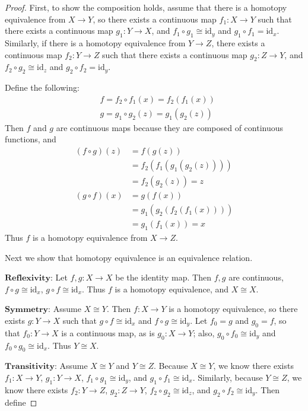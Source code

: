 \documentclass[12pt]{article}
\begin{document}
\begin{proof}
    First, to show the composition holds, assume that there is a homotopy equivalence from $X \to Y$, so there exists a continuous map $f_1: X \to Y$ such that there exists a continuous map $g_1: Y \to X$, and $f_1 \circ g_1 \cong \text{id}_y$ and $g_1 \circ f_1 = \text{id}_x$. Similarly, if there is a homotopy equivalence from $Y \to Z$, there exists a continuous map $f_2: Y \to Z$ such that there exists a continuous map $g_2: Z \to Y$, and $f_2 \circ g_2 \cong \text{id}_z$ and $g_2 \circ f_2 = \text{id}_y$.
    \par Define the following:
    \begin{align*}
        & f = f_2 \circ f_1 (x) = f_2(f_1(x)) \\
        & g = g_1 \circ g_2 (z) = g_1(g_2(z))
    \end{align*}
    Then $f$ and $g$ are continuous maps because they are composed of continuous functions, and 
    \begin{align*}
        (f \circ g)(z) &= f(g(z)) \\
        &= f_2(f_1(g_1(g_2(z)))) \\ 
        &= f_2(g_2(z)) = z \\ 
        (g \circ f)(x) &= g(f(x)) \\ 
        &= g_1(g_2(f_2(f_1(x)))) \\ 
        &= g_1(f_1(x))=x
    \end{align*}
    Thus $f$ is a homotopy equivalence from $X \to Z$. 
    \par Next we show that homotopy equivalence is an equivalence relation. 
    \par $\mathbf{Reflexivity}$: Let $f, g: X \to X$ be the identity map. Then $f,g$ are continuous, $f \circ g \cong \text{id}_x$, $g \circ f \cong \text{id}_x$. Thus $f$ is a homotopy equivalence, and $X \cong X$.
    \par $\mathbf{Symmetry}$: Assume $X \cong Y$. Then $f: X \to Y$ is a homotopy equivalence, so there exists $g: Y \to X$ such that $g \circ f \cong \text{id}_x$ and $f \circ g \cong \text{id}_y$. Let $f_0=g$ and $g_0=f$, so that $f_0:Y \to X$ is a continuous map, as is $g_0: X \to Y$; also, $g_0 \circ f_0 \cong \text{id}_y$ and $f_0 \circ g_0 \cong \text{id}_x$. Thus $Y \cong X$.
    \par $\mathbf{Transitivity}$: Assume $X \cong Y$ and $Y \cong Z$. Because $X \cong Y$, we know there exists $f_1:X \to Y$, $g_1:Y \to X$, $f_1 \circ g_1 \cong \text{id}_y$, and $g_1 \circ f_1 \cong \text{id}_x$. Similarly, because $Y \cong Z$, we know there exists $f_2:Y \to Z$, $g_2:Z \to Y$, $f_2 \circ g_2 \cong \text{id}_z$, and $g_2 \circ f_2 \cong \text{id}_y$. Then define 

\end{proof}
\end{document}
